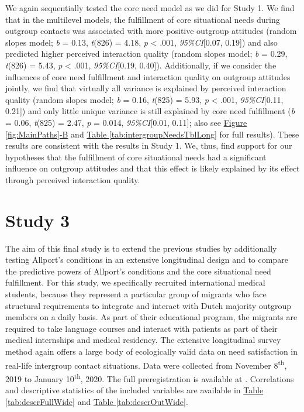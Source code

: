 \documentclass[man, 12pt, a4paper, mask]{apa7}
\theoremstyle{break}
\theoremstyle{plain}
\newcommand{\fgrref}[2][]{\hyperref[#2]{Figure \ref*{#2}#1}}
\newcommand{\tblref}[2][]{\hyperref[#2]{Table \ref*{#2}#1}}
\begin{document}
We again sequentially tested the core need model as we did for Study 1.
We find that in the multilevel models, the fulfillment of core
situational needs during outgroup contacts was associated with more
positive outgroup attitudes (random slopes model; \textit{b} = 0.13,
\textit{t}(826) = 4.18, \textit{p} \textless{} .001,
\textit{95\%CI}{[}0.07, 0.19{]}) and also predicted higher perceived
interaction quality (random slopes model; \textit{b} = 0.29,
\textit{t}(826) = 5.43, \textit{p} \textless{} .001,
\textit{95\%CI}{[}0.19, 0.40{]}). Additionally, if we consider the
influences of core need fulfillment and interaction quality on outgroup
attitudes jointly, we find that virtually all variance is explained by
perceived interaction quality (random slopes model; \textit{b} = 0.16,
\textit{t}(825) = 5.93, \textit{p} \textless{} .001,
\textit{95\%CI}{[}0.11, 0.21{]}) and only little unique variance is
still explained by core need fulfillment (\textit{b} = 0.06,
\textit{t}(825) = 2.47, \textit{p} = 0.014, \textit{95\%CI}{[}0.01,
0.11{]}; also see \fgrref[-B]{fig:MainPaths} and
\tblref{tab:intergroupNeedsTblLong} for full results). These results are
consistent with the results in Study 1. We, thus, find support for our
hypotheses that the fulfillment of core situational needs had a
significant influence on outgroup attitudes and that this effect is
likely explained by its effect through perceived interaction quality.

\section{Study 3}

The aim of this final study is to extend the previous studies by
additionally testing Allport's conditions in an extensive longitudinal
design and to compare the predictive powers of Allport's conditions and
the core situational need fulfillment. For this study, we specifically
recruited international medical students, because they represent a
particular group of migrants who face structural requirements to
integrate and interact with Dutch majority outgroup members on a daily
basis. As part of their educational program, the migrants are required
to take language courses and interact with patients as part of their
medical internships and medical residency. The extensive longitudinal
survey method again offers a large body of ecologically valid data on
need satisfaction in real-life intergroup contact situations. Data were
collected from November 8\textsuperscript{th}, 2019 to January
10\textsuperscript{th}, 2020. The full preregistration is available at
\citet[][]{KreienkampMasked2021f}. Correlations and descriptive
statistics of the included variables are available in
\tblref{tab:descrFullWide} and \tblref{tab:descrOutWide}.
\end{document}
